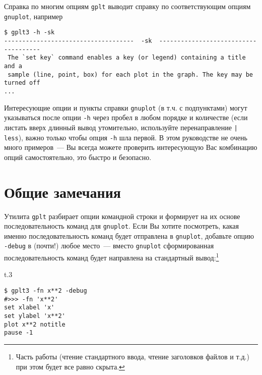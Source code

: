 \documentclass[12pt]{article}
\def\gplt{{\tt gplt}}
\def\gnuplot{{\tt gnuplot}}
\begin{document}
Справка по многим опциям \gplt{} выводит справку по соответствующим опциям \gnuplot, например
\begin{verbatim}
$ gplt3 -h -sk
------------------------------------  -sk  -------------------------------------
 The `set key` command enables a key (or legend) containing a title and a
 sample (line, point, box) for each plot in the graph. The key may be turned off
...
\end{verbatim}

Интересующие опции и пункты справки \gnuplot{} (в т.ч. с подпунктами) могут указываться после опции \verb'-h' через пробел в любом порядке и количестве
(если листать вверх длинный вывод утомительно, используйте перенаправление \verb'| less'), важно только чтобы опция \verb'-h' шла первой.
В этом руководстве не очень много примеров~--- Вы всегда можете проверить интересующую Вас комбинацию опций самостоятельно, это быстро и безопасно. 
\pagebreak

\section{Общие замечания}\label{main:sec}
Утилита \gplt{} разбирает опции командной строки и формирует на их основе последовательность команд для \gnuplot. Если Вы хотите посмотреть,
какая именно последовательность команд будет отправлена в \gnuplot, добавьте опцию \verb'-debug' в (почти!) любое место~--- вместо \gnuplot{}
сформированная последовательность команд будет направлена на стандартный вывод:\footnote{Часть работы
  (чтение стандартного ввода, чтение заголовков файлов и т.д.) при этом будет все равно скрыта.}
\begin{wrapfigure}[1]{t}{.3\textwidth}
  \vphantom{.}
  \vspace{-1.3cm}

\end{wrapfigure}
\begin{verbatim}
$ gplt3 -fn x**2 -debug
#>>> -fn 'x**2'
set xlabel 'x'
set ylabel 'x**2'
plot x**2 notitle   
pause -1
\end{verbatim}

\vspace{5mm}
\end{document}
